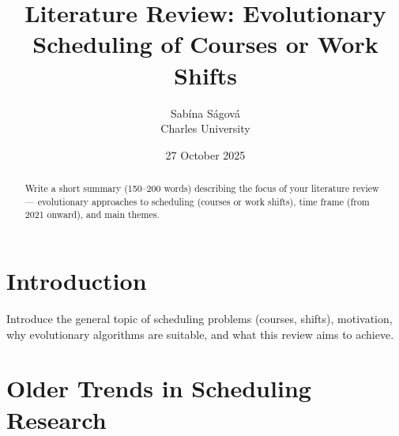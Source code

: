 \documentclass[a4paper,12pt]{article}
\title{Literature Review: Evolutionary Scheduling of Courses or Work Shifts}
\author{Sabína Ságová\\ Charles University}
\date{27 October 2025}
\begin{document}
\maketitle

\begin{abstract}
Write a short summary (150–200 words) describing the focus of your literature review — evolutionary approaches to scheduling (courses or work shifts), time frame (from 2021 onward), and main themes.
\end{abstract}

\section{Introduction}
Introduce the general topic of scheduling problems (courses, shifts), motivation, why evolutionary algorithms are suitable, and what this review aims to achieve.

\section{Older Trends in Scheduling Research}
\end{document}
